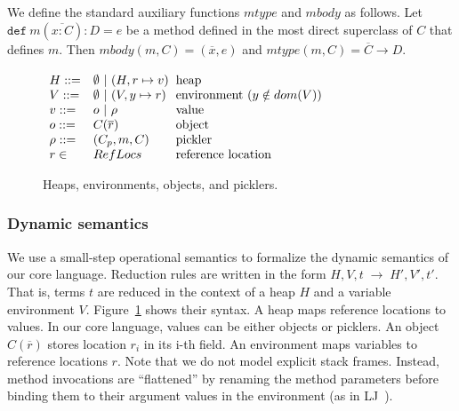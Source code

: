 \documentclass[preprint,10pt]{sigplanconf}
\theoremstyle{definition}
\theoremstyle{definition}
\newcommand{\ba}{\begin{array}}
\newcommand{\ea}{\end{array}}
\newcommand{\typ}{:}
\newcommand{\seq}[1]{\overline{#1}}
\newcommand{\sreduce}[6]{#1, #2, #3 \;\longrightarrow\; #4, #5, #6}
\begin{document}
We define the standard auxiliary functions $mtype$ and $mbody$ as follows.
Let $\texttt{def}~m(\seq{x \typ C}) \typ D = e$ be a method defined in the
most direct superclass of $C$ that defines $m$. Then
$mbody(m, C) = (\seq{x}, e)$ and $mtype(m, C) = \seq{C} \rightarrow D$.

\begin{figure}[ht!]

$\ba[t]{ll@{\hspace{2mm}}l}
H    ::= & \emptyset ~|~ (H, r \mapsto v)              & \mbox{heap} \\
V    ::= & \emptyset ~|~ (V, y \mapsto r)              & \mbox{environment}~(y \notin dom(V)) \\
v    ::= & o ~|~ \rho                                  & \mbox{value} \\
o    ::= & C(\seq{r})                                  & \mbox{object} \\
\rho ::= & (C_p, m, C)                                 & \mbox{pickler} \\
r \in    & RefLocs                                     & \mbox{reference location}
\ea$

\caption{Heaps, environments, objects, and picklers.}\label{fig:heaps-stacks}
\end{figure}

\vspace{0em}
\subsubsection{Dynamic semantics}


We use a small-step operational semantics to formalize the dynamic semantics
of our core language. Reduction rules are written in the form
$\sreduce H V t {H'} {V'} {t'}$. That is, terms $t$ are reduced in the context of
a heap $H$ and a variable environment $V$.
Figure~\ref{fig:heaps-stacks} shows their syntax. A
heap maps reference locations to values. In our core language, values can be
either objects or picklers. An object
$C(\seq{r})$ stores location $r_i$ in its i-th field. An environment maps
variables to reference locations $r$. Note that
we do not model explicit stack frames. Instead, method invocations are
``flattened'' by renaming the method parameters before binding them to
their argument values in the environment (as in LJ~\cite{StrnisaSP07}).
\end{document}
